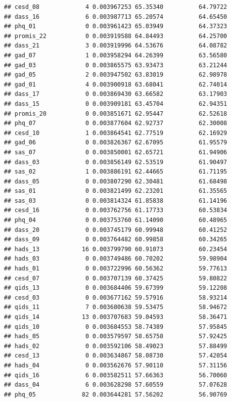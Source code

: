 \documentclass[
]{article}
\begin{document}
\begin{verbatim}
## cesd_08             4 0.003967253 65.35340          64.79722
## dass_16             6 0.003987713 65.20574          64.65450
## phq_01              0 0.003961423 65.03949          64.37323
## promis_22           0 0.003919588 64.84493          64.25700
## dass_21             3 0.003919996 64.53676          64.08782
## gad_07              1 0.003958294 64.26399          63.56580
## gad_03              0 0.003865575 63.93473          63.21244
## gad_05              2 0.003947502 63.83019          62.98978
## gad_01              4 0.003900918 63.68041          62.74014
## dass_17             0 0.003869430 63.66582          63.17903
## dass_15             0 0.003909181 63.45704          62.94351
## promis_20           0 0.003851671 62.95447          62.52618
## phq_07              0 0.003877604 62.92737          62.30008
## cesd_10             1 0.003864541 62.77519          62.16929
## gad_06              0 0.003826367 62.67095          61.95579
## sas_07              0 0.003850001 62.65721          61.94906
## dass_03             0 0.003856149 62.53519          61.90497
## sas_02              1 0.003886191 62.44665          61.71195
## dass_05             0 0.003807290 62.30481          61.68498
## sas_01              0 0.003821499 62.23201          61.35565
## sas_03              0 0.003814324 61.85838          61.14196
## cesd_16             0 0.003762756 61.17733          60.53834
## phq_04              0 0.003753760 61.14090          60.48965
## dass_20             0 0.003745179 60.99948          60.41252
## dass_09             0 0.003764482 60.99858          60.34265
## hads_13            16 0.003799790 60.91073          60.23454
## hads_03             0 0.003749486 60.70202          59.98904
## hads_01             0 0.003722996 60.56362          59.77613
## cesd_07             0 0.003707139 60.37425          59.80822
## qids_13             0 0.003684406 59.67399          59.12208
## cesd_03             0 0.003677162 59.57916          58.93214
## qids_11             7 0.003680638 59.53475          58.94672
## qids_14            13 0.003707683 59.04593          58.36471
## qids_10             0 0.003684553 58.74389          57.95845
## hads_05             0 0.003579597 58.65758          57.92425
## hads_02             0 0.003592106 58.49023          57.88499
## cesd_13             0 0.003634867 58.08730          57.42054
## hads_04             0 0.003562676 57.90110          57.31156
## qids_16             6 0.003582511 57.66363          56.70060
## dass_04             6 0.003628298 57.60559          57.07628
## phq_05             82 0.003644281 57.56202          56.90769

\end{verbatim}
\end{document}
